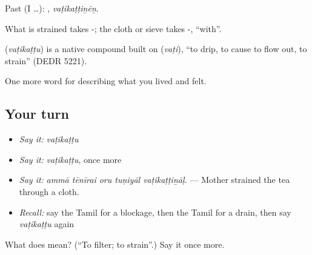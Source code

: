 Past (I …): , \emph{vaṭikaṭṭiṉēṉ}.

What is strained takes -; the cloth or sieve takes -, \textquotedblleft{}with\textquotedblright{}.

\begin{cousinweb}
\textbf{} (\emph{vaṭikaṭṭu}) is a native compound built on  (\emph{vaṭi}), \textquotedblleft{}to drip, to cause to flow out, to strain\textquotedblright{} (DEDR 5221).
\end{cousinweb}

\begin{grammarlens}[title={What you've built}]
One more word for describing what you lived and felt.
\end{grammarlens}

\subsection*{Your turn}
\begin{itemize}
\raggedright
  \item \emph{Say it:} \emph{vaṭikaṭṭu}
  \item \emph{Say it:} \emph{vaṭikaṭṭu}, once more
  \item \emph{Say it:} \emph{ammā tēnīrai oru tuṇiyāl vaṭikaṭṭiṉāḷ.} — Mother strained the tea through a cloth.
  \item \emph{Recall:} say the Tamil for a blockage, then the Tamil for a drain, then say \emph{vaṭikaṭṭu} again
\end{itemize}

\begin{tcolorbox}[breakable,colback=teal!4,colframe=teal!35!black,title={Before you move on}]
What does  mean? (\textquotedblleft{}To filter; to strain\textquotedblright{}.) Say it once more.
\end{tcolorbox}
